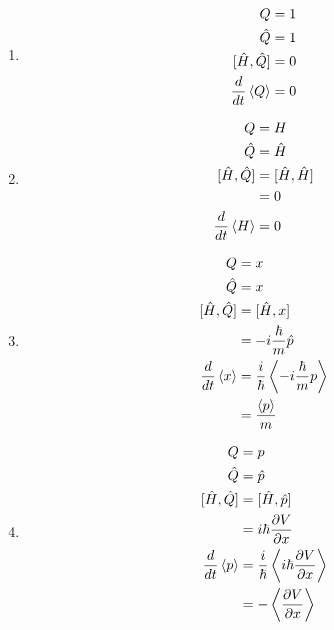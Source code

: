 \documentclass{article}
\begin{document}
\begin{enumerate}
  \item

        \begin{align*}
          Q                        & = 1 \\
          \hat{Q}                  & = 1 \\
          [\hat{H}, \hat{Q}]       & = 0 \\
          \frac{d}{d t} \braket{Q} & = 0
        \end{align*}

  \item

        \begin{align*}
          Q                        & = H                  \\
          \hat{Q}                  & = \hat{H}            \\
          [\hat{H}, \hat{Q}]       & = [\hat{H}, \hat{H}] \\
                                   & = 0                  \\
          \frac{d}{d t} \braket{H} & = 0
        \end{align*}

  \item

        \begin{align*}
          Q                        & = x                                             \\
          \hat{Q}                  & = x                                             \\
          [\hat{H}, \hat{Q}]       & = [\hat{H}, x]                                  \\
                                   & = -i \frac{\hbar}{m} \hat{p}                    \\
          \frac{d}{d t} \braket{x} & = \frac{i}{\hbar} \Braket{-i \frac{\hbar}{m} p} \\
                                   & = \frac{\braket{p}}{m}
        \end{align*}

  \item

        \begin{align*}
          Q                        & = p                                                              \\
          \hat{Q}                  & = \hat{p}                                                        \\
          [\hat{H}, \hat{Q}]       & = [\hat{H}, \hat{p}]                                             \\
                                   & = i \hbar \frac{\partial V}{\partial x}                          \\
          \frac{d}{d t} \braket{p} & = \frac{i}{\hbar} \Braket{i \hbar \frac{\partial V}{\partial x}} \\
                                   & = -\Braket{\frac{\partial V}{\partial x}}
        \end{align*}
\end{enumerate}
\end{document}
